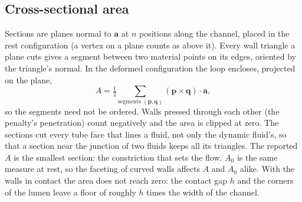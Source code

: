 \documentclass[11pt,a4paper]{article}
\theoremstyle{remark}
\begin{document}
\subsection{Cross-sectional area}
Sections are planes normal to $\bm a$ at $n$ positions along the channel, placed in the rest
configuration (a vertex on a plane counts as above it). Every wall triangle a plane cuts gives a
segment between two material points on its edges, oriented by the triangle's normal. In the
deformed configuration the loop encloses, projected on the plane,
\begin{equation}
  A = \tfrac12 \sum_{\text{segments } (\bm p,\bm q)} (\bm p \times \bm q)\cdot\bm a ,
\end{equation}
so the segments need not be ordered. Walls pressed through each other (the penalty's penetration)
count negatively and the area is clipped at zero. The sections cut every tube face that lines a fluid,
not only the dynamic fluid's, so that a section near the junction of two fluids keeps all its
triangles. The reported $A$ is the smallest section: the
constriction that sets the flow. $A_0$ is the same measure at rest, so the faceting of curved walls
affects $A$ and $A_0$ alike. With the walls in contact the area does not reach zero: the contact
gap $h$ and the corners of the lumen leave a floor of roughly $h$ times the width of the channel.
\end{document}
